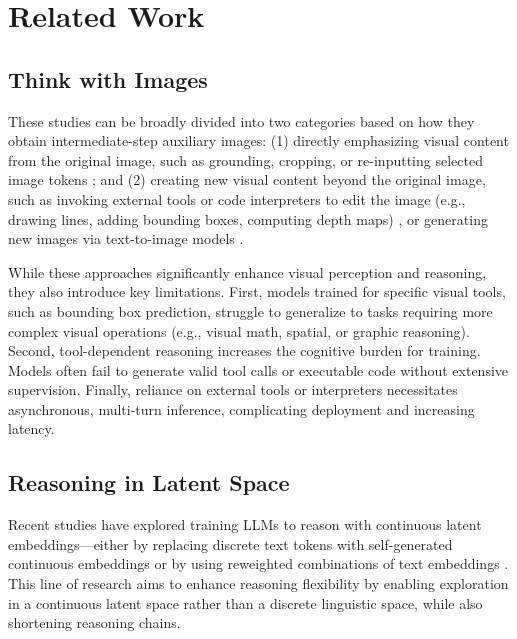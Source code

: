\section{Related Work}
\label{sec:related_work}

\subsection{Think with Images}
These studies can be broadly divided into two categories based on how they obtain intermediate-step auxiliary images:
(1) directly emphasizing visual content from the original image, such as grounding, cropping, or re-inputting selected image tokens \citep{sun2024visual, zheng2025deepeyes, zhang2025chain, sarch2025grounded, chung2025don, chen2025mint}; and
(2) creating new visual content beyond the original image, such as invoking external tools or code interpreters to edit the image (e.g., drawing lines, adding bounding boxes, computing depth maps) \citep{hu2024visual, zhao2025pyvision, su2025openthinkimg, chen2025learning, qi2024cogcom, fu2025refocus, zhang2025thyme, zhou2025reinforced}, or generating new images via text-to-image models \citep{chern2025thinking, li2025imagine, xu2025visual}.

While these approaches significantly enhance visual perception and reasoning, they also introduce key limitations.
First, models trained for specific visual tools, such as bounding box prediction, struggle to generalize to tasks requiring more complex visual operations (e.g., visual math, spatial, or graphic reasoning).
Second, tool-dependent reasoning increases the cognitive burden for training. Models often fail to generate valid tool calls or executable code without extensive supervision.
Finally, reliance on external tools or interpreters necessitates asynchronous, multi-turn inference, complicating deployment and increasing latency.


\subsection{Reasoning in Latent Space}
Recent studies have explored training LLMs to reason with continuous latent embeddings—either by replacing discrete text tokens with self-generated continuous embeddings \citep{hao2024training, geiping2025scaling, shen2025codi, wei2025simcotsupervisedimplicit, butt2025softtokenshard, wang2025synadapt} or by using reweighted combinations of text embeddings \citep{yang2025machine, pham2025multimodal}. This line of research aims to enhance reasoning flexibility by enabling exploration in a continuous latent space rather than a discrete linguistic space, while also shortening reasoning chains.

